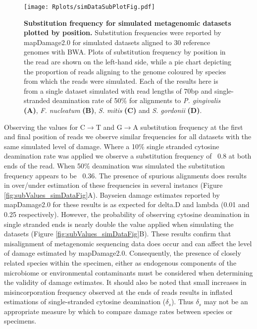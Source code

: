 \documentclass[12pt, a4paper]{article}
\begin{document}
\begin{figure}[ht!]
	\setlength{\abovecaptionskip}{6pt}	
	\begin{center}
	\texttt{[image: Rplots/simDataSubPlotFig.pdf]}
	\end{center}
	\small\caption[Substitution frequency for simulated metagenomic datasets plotted by position.]{\textbf{Substitution frequency for simulated metagenomic datasets plotted by position. }{Substitution frequencies were reported by mapDamage2.0 for simulated datasets aligned to 30 reference genomes with BWA. Plots of substitution frequency by position in the read are shown on the left-hand side, while a pie chart depicting the proportion of reads aligning to the genome coloured by species from which the reads were simulated. Each of the results here is from a single dataset simulated with read lengths of 70bp and single-stranded deamination rate of 50\% for alignments to \textit{P. gingivalis} \textbf{(A)}, \textit{F. nucleatum} \textbf{(B)}, \textit{S. mitis} \textbf{(C)} and \textit{S. gordonii} \textbf{(D)}.}}\label{fig:simDataSubPlotFig}
\end{figure}
\clearpage

Observing the values for C$\to$T and G$\to$A substitution frequency at the first and final position of reads we observe similar frequencies for all datasets with the same simulated level of damage. 
Where a 10\% single stranded cytosine deamination rate was applied we observe a substitution frequency of ~0.8 at both ends of the read.
When 50\% deamination was simulated the substitution frequency appears to be ~0.36.
The presence of spurious alignments does results in over/under estimation of these frequencies in several instancs (Figure \ref{fig:subValues_simDataFig}A).
Bayseien damage estimates reported by mapDamage2.0 for these results is as expected for delta.D and lambda (0.01 and 0.25 respectively). However, the probability of observing cytosine deamination in single stranded ends is nearly double the value applied when simulating the datasets (Figure \ref{fig:subValues_simDataFig}B).
These results confirm that misalignment of metagenomic sequencing data does occur and can affect the level of damage estimated by mapDamage2.0. 
Consequently, the presence of closely related species within the specimen, either as endogenous components of the microbiome or environmental contaminants must be considered when determining the validity of damage estimates. 
It should also be noted that small increases in misincorporation frequency observed at the ends of reads results in inflated estimations of single-stranded cytosine deamination ($\delta_s$). 
Thus $\delta_s$ may not be an appropriate measure by which to compare damage rates between species or specimens.
\end{document}
